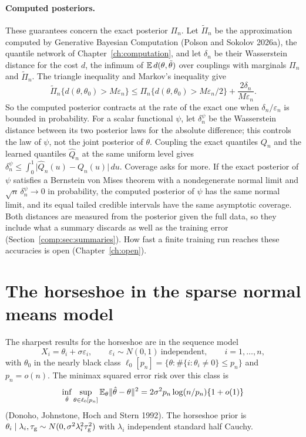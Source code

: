 \paragraph{Computed posteriors.} These guarantees concern the exact posterior $\Pi_n$. Let $\widetilde\Pi_n$ be the approximation computed by Generative Bayesian Computation (Polson and Sokolov 2026a), the quantile network of Chapter~\ref{ch:computation}, and let $\delta_n$ be their Wasserstein distance for the cost $d$, the infimum of $\mathbb{E}\,d(\theta,\tilde\theta)$ over couplings with marginals $\Pi_n$ and $\widetilde\Pi_n$. The triangle inequality and Markov's inequality give
\[
\widetilde\Pi_n\{d(\theta,\theta_0)>M\varepsilon_n\}\le\Pi_n\{d(\theta,\theta_0)>M\varepsilon_n/2\}+\frac{2\delta_n}{M\varepsilon_n}.
\]
So the computed posterior contracts at the rate of the exact one when $\delta_n/\varepsilon_n$ is bounded in probability. For a scalar functional $\psi$, let $\delta_n^\psi$ be the Wasserstein distance between its two posterior laws for the absolute difference; this controls the law of $\psi$, not the joint posterior of $\theta$. Coupling the exact quantiles $Q_n$ and the learned quantiles $\widehat Q_n$ at the same uniform level gives $\delta_n^\psi\le\int_0^1\lvert\widehat Q_n(u)-Q_n(u)\rvert\,du$. Coverage asks for more. If the exact posterior of $\psi$ satisfies a Bernstein von Mises theorem with a nondegenerate normal limit and $\sqrt n\,\delta_n^\psi\to0$ in probability, the computed posterior of $\psi$ has the same normal limit, and its equal tailed credible intervals have the same asymptotic coverage. Both distances are measured from the posterior given the full data, so they include what a summary discards as well as the training error (Section~\ref{comp:sec:summaries}). How fast a finite training run reaches these accuracies is open (Chapter~\ref{ch:open}).

\section{The horseshoe in the sparse normal means model}\label{pg:sec:hs}

The sharpest results for the horseshoe are in the sequence model
\[
X_i = \theta_i + \sigma\varepsilon_i,\qquad \varepsilon_i\sim N(0,1)\ \text{independent},\qquad i = 1,\dots,n,
\]
with $\theta_0$ in the nearly black class $\ell_0[p_n] = \{\theta: \#\{i:\theta_i\neq0\}\le p_n\}$ and $p_n = o(n)$. The minimax squared error risk over this class is
\[
\inf_{\hat\theta}\sup_{\theta\in\ell_0[p_n]}\mathbb{E}_\theta\lVert\hat\theta-\theta\rVert^2 = 2\sigma^2p_n\log(n/p_n)\{1+o(1)\}
\]
(Donoho, Johnstone, Hoch and Stern 1992). The horseshoe prior is $\theta_i\mid\lambda_i,\tau_{\mathrm{g}}\sim N(0,\sigma^2\lambda_i^2\tau_{\mathrm{g}}^2)$ with $\lambda_i$ independent standard half Cauchy.

